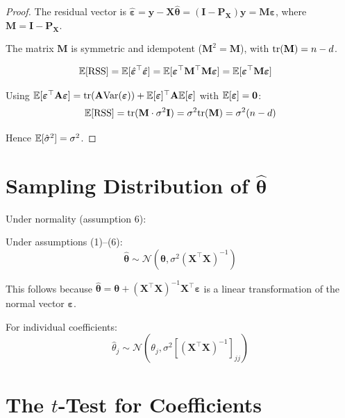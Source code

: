 \documentclass[main.tex]{subfiles}
\begin{document}
\begin{proof}
The residual vector is $\hat{\boldsymbol{\varepsilon}} = \mathbf{y} - \mathbf{X}\hat{\boldsymbol{\theta}} = (\mathbf{I} - \mathbf{P}_{\mathbf{X}})\mathbf{y} = \mathbf{M}\boldsymbol{\varepsilon}$, where $\mathbf{M} = \mathbf{I} - \mathbf{P}_{\mathbf{X}}$.

The matrix $\mathbf{M}$ is symmetric and idempotent ($\mathbf{M}^2 = \mathbf{M}$), with $\text{tr}(\mathbf{M}) = n - d$.

\begin{align}
\mathbb{E}[\text{RSS}] &= \mathbb{E}[\hat{\boldsymbol{\varepsilon}}^\top\hat{\boldsymbol{\varepsilon}}] = \mathbb{E}[\boldsymbol{\varepsilon}^\top\mathbf{M}^\top\mathbf{M}\boldsymbol{\varepsilon}] = \mathbb{E}[\boldsymbol{\varepsilon}^\top\mathbf{M}\boldsymbol{\varepsilon}]
\end{align}

Using $\mathbb{E}[\boldsymbol{\varepsilon}^\top\mathbf{A}\boldsymbol{\varepsilon}] = \text{tr}(\mathbf{A}\text{Var}(\boldsymbol{\varepsilon})) + \mathbb{E}[\boldsymbol{\varepsilon}]^\top\mathbf{A}\mathbb{E}[\boldsymbol{\varepsilon}]$ with $\mathbb{E}[\boldsymbol{\varepsilon}] = \mathbf{0}$:
$$\mathbb{E}[\text{RSS}] = \text{tr}(\mathbf{M} \cdot \sigma^2\mathbf{I}) = \sigma^2 \text{tr}(\mathbf{M}) = \sigma^2(n-d)$$

Hence $\mathbb{E}[\hat{\sigma}^2] = \sigma^2$.
\end{proof}

\needspace{0.33\textheight}
\section{Sampling Distribution of $\hat{\boldsymbol{\theta}}$}

Under normality (assumption 6):

\begin{theorem}
Under assumptions (1)--(6):
$$\hat{\boldsymbol{\theta}} \sim \mathcal{N}\left(\boldsymbol{\theta}, \sigma^2(\mathbf{X}^\top\mathbf{X})^{-1}\right)$$
\end{theorem}

This follows because $\hat{\boldsymbol{\theta}} = \boldsymbol{\theta} + (\mathbf{X}^\top\mathbf{X})^{-1}\mathbf{X}^\top\boldsymbol{\varepsilon}$ is a linear transformation of the normal vector $\boldsymbol{\varepsilon}$.

For individual coefficients:
$$\hat{\theta}_j \sim \mathcal{N}\left(\theta_j, \sigma^2[(\mathbf{X}^\top\mathbf{X})^{-1}]_{jj}\right)$$

\needspace{0.33\textheight}
\section{The $t$-Test for Coefficients}
\end{document}
